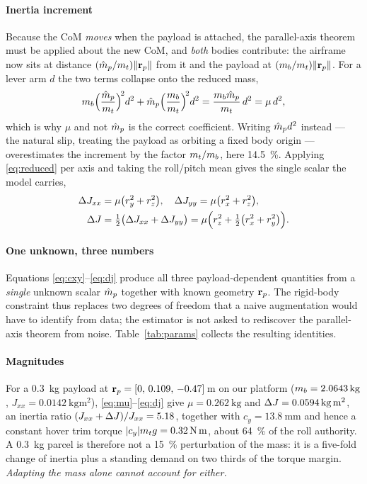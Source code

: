 \paragraph{Inertia increment} Because the CoM \emph{moves} when the
payload is attached, the parallel-axis theorem must be applied about the
new CoM, and \emph{both} bodies contribute: the airframe now sits at
distance $(\hat{m}_p/m_t)\|\mathbf{r}_p\|$ from it and the payload at
$(m_b/m_t)\|\mathbf{r}_p\|$. For a lever arm $d$ the two terms collapse onto the
reduced mass,
\begin{equation}
m_b \Bigl(\frac{\hat{m}_p}{m_t}\Bigr)^{\!2} d^2 + \hat{m}_p \Bigl(\frac{m_b}{m_t}\Bigr)^{\!2} d^2
= \frac{m_b \hat{m}_p}{m_t}\, d^2 = \mu\, d^2 ,
\label{eq:reduced}
\end{equation}
which is why $\mu$ and not $\hat{m}_p$ is the correct coefficient. Writing
$\hat{m}_p d^2$ instead --- the natural slip, treating the payload as orbiting
a fixed body origin --- overestimates the increment by the factor
$m_t/m_b$, here \SI{14.5}{\percent}. Applying \eqref{eq:reduced} per axis
and taking the roll/pitch mean gives the single scalar the model carries,
\begin{align}
\Delta J_{xx} &= \mu\bigl(r_y^2 + r_z^2\bigr), \quad
\Delta J_{yy} = \mu\bigl(r_x^2 + r_z^2\bigr), \nonumber\\
\Delta J &= \tfrac{1}{2}\bigl(\Delta J_{xx} + \Delta J_{yy}\bigr) = \mu\Bigl( r_z^2 + \tfrac{1}{2}\bigl(r_x^2 + r_y^2\bigr) \Bigr).
\label{eq:dj}
\end{align}

\paragraph{One unknown, three numbers} Equations
\eqref{eq:cxy}--\eqref{eq:dj} produce all three payload-dependent
quantities from a \emph{single} unknown scalar $\hat{m}_p$ together with known
geometry $\mathbf{r}_p$. The rigid-body constraint thus replaces two degrees of
freedom that a naive augmentation would have to identify from data; the
estimator is not asked to rediscover the parallel-axis theorem from noise.
Table~\ref{tab:params} collects the resulting identities.

\paragraph{Magnitudes} For a \SI{0.3}{\kg} payload at
$\mathbf{r}_p = [0,\, 0.109,\, -0.47]\,$\si{\meter} on our platform
($\mb = \SI{2.0643}{\kg}$, $J_{xx} = \SI{0.0142}{\kg\meter\squared}$),
\eqref{eq:mu}--\eqref{eq:dj} give $\mu = \SI{0.262}{\kg}$ and
$\dJ = \SI{0.0594}{\kg\meter\squared}$, an inertia ratio
$(J_{xx}+\Delta J)/J_{xx} = 5.18$, together with $c_y = \SI{13.8}{\milli\meter}$
and hence a constant hover trim torque $|c_y|m_t g = \SI{0.32}{\newton\meter}$,
about \SI{64}{\percent} of the roll authority. A \SI{0.3}{\kg} parcel is
therefore not a \SI{15}{\percent} perturbation of the mass: it is a
five-fold change of inertia plus a standing demand on two thirds of the
torque margin. \emph{Adapting the mass alone cannot account for either.}

